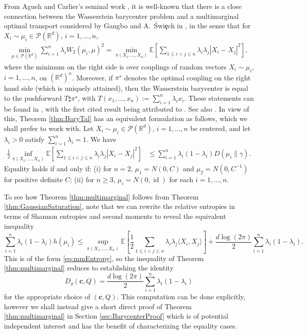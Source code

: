 \documentclass[10pt]{article}
\newcommand{\id}{\operatorname{id}}
\newcommand{\EE}{\mathbb{E}}
\newcommand{\R}{\mathbb{R}}
\newenvironment{manualtheorem}[1]{%
  \renewcommand\themanualtheoreminner{#1}%
  \manualtheoreminner
}{\endmanualtheoreminner}
\begin{document}
From  Agueh and Carlier's seminal work \cite{AC}, it is well-known that there is a close connection between the Wasserstein barycenter problem and a multimarginal optimal transport considered by Gangbo  and A.~\'{S}wi\c{e}ch in \cite{GC}, in the sense that for $X_i \sim \mu_i \in \mathcal{P}(\mathbb{R}^d)$, $i=1,\dots, n$, 
\begin{align}
 \min_{\mu \in \mathcal{P}(\mathbb{R}^d)}   \sum_{i=1}^n  \lambda_i W_2(\mu_i,\mu)^2  = \min_{\pi(X_1, \dots, X_n)} \EE\left[  \sum_{1 \leq i < j \leq n} \lambda_i \lambda_j |X_i - X_j|^2  \right], \label{barycenterMultimarginalEquivalence}
\end{align}
where the minimum on the right side is over couplings of random vectors $X_i \sim \mu_i$, $i=1, \dots, n$, on $(\mathbb{R}^d)^n$.   Moreover, if $\pi^{\star}$ denotes the optimal coupling on the right hand side (which is  uniquely attained), then the Wasserstein barycenter is equal to the pushforward $ T{\sharp} \pi^{\star}$, with $T(x_1, \dots, x_n) := \sum_{i=1}^n \lambda_i x_i$.   These statements can be found in \cite[Theorem 4.1 and Proposition 4.2]{AC}, with the first cited result being attributed to \cite{GC}.   See also \cite[Theorem 2.4]{KW}. In view of  this, Theorem \ref{thm:BaryTal} has an equivalent formulation as follows, which we shall prefer to work with.
\begin{manualtheorem}{4'}\label{thm:multimarginal} Let $X_i \sim \mu_i \in \mathcal{P}(\R^d)$, $i=1, \dots ,n $ be centered, and let $\lambda_i >  0$ satisfy $\sum_{i=1}^n \lambda_i = 1$.  We have  
\begin{align*}
\frac{1}{2} \inf_{\pi(X_1, \dots, X_{n})} \EE\left[  \sum_{1 \leq i < j \leq n} \lambda_i \lambda_j |X_i - X_j|^2  \right]  &\leq   \sum_{i=1}^n  \lambda_i (1- \lambda_i ) D(\mu_i \| \gamma).
\end{align*}
Equality holds if and only if: (i) for $n=2$,  $\mu_1 = N(0,C)$ and $\mu_2 = N(0,C^{-1})$ for positive definite $C$; (ii) for $n\geq 3$, $\mu_i =   N(0,\id)$ for each $i=1,\dots, n$.  
\end{manualtheorem}

To see how Theorem  \ref{thm:multimarginal}  follows from Theorem \ref{thm:GaussianSaturation}, note that we can rewrite the relative entropies in terms of Shannon entropies and second moments to reveal the equivalent inequality
$$
\sum_{i=1}^n \lambda_i (1-\lambda_i) h(\mu_i) \leq \sup_{\pi(X_1, \dots, X_{n})} \EE\left[  \frac{1}{2}\sum_{1 \leq i < j \leq n} \lambda_i \lambda_j \langle X_i , X_j\rangle  \right] + \frac{d \log(2\pi)}{2}\sum_{i=1}^n \lambda_i (1-\lambda_i). 
$$
This is of the form \eqref{eq:mmEntropy}, so the inequality of Theorem \ref{thm:multimarginal} reduces to establishing the identity 
$$
D_g(\mathbf{c},Q) =  \frac{d \log(2\pi)}{2}\sum_{i=1}^n \lambda_i (1-\lambda_i)
$$
for the appropriate choice of  $(\mathbf{c},Q)$.  This computation can be done explicitly, however we shall instead give a short direct proof of Theorem \ref{thm:multimarginal} in Section \ref{sec:BarycenterProof} which is of potential independent interest and has the benefit of characterizing the equality cases. 
 
\end{document}
